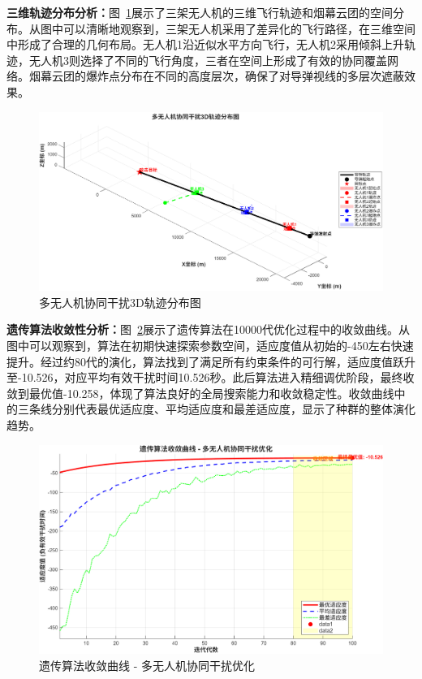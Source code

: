 \textbf{三维轨迹分布分析：}图~\ref{fig:A_4_1}展示了三架无人机的三维飞行轨迹和烟幕云团的空间分布。从图中可以清晰地观察到，三架无人机采用了差异化的飞行路径，在三维空间中形成了合理的几何布局。无人机1沿近似水平方向飞行，无人机2采用倾斜上升轨迹，无人机3则选择了不同的飞行角度，三者在空间上形成了有效的协同覆盖网络。烟幕云团的爆炸点分布在不同的高度层次，确保了对导弹视线的多层次遮蔽效果。

\begin{figure}[htbp]
\centering
\includegraphics[width=\textwidth]{figures/A_4_1.png}
\caption{多无人机协同干扰3D轨迹分布图}
\label{fig:A_4_1}
\end{figure}

\textbf{遗传算法收敛性分析：}图~\ref{fig:A_4_2}展示了遗传算法在10000代优化过程中的收敛曲线。从图中可以观察到，算法在初期快速探索参数空间，适应度值从初始的-450左右快速提升。经过约80代的演化，算法找到了满足所有约束条件的可行解，适应度值跃升至-10.526，对应平均有效干扰时间10.526秒。此后算法进入精细调优阶段，最终收敛到最优值-10.258，体现了算法良好的全局搜索能力和收敛稳定性。收敛曲线中的三条线分别代表最优适应度、平均适应度和最差适应度，显示了种群的整体演化趋势。

\begin{figure}[htbp]
\centering
\includegraphics[width=\textwidth]{figures/A_4_2.png}
\caption{遗传算法收敛曲线 - 多无人机协同干扰优化}
\label{fig:A_4_2}
\end{figure}